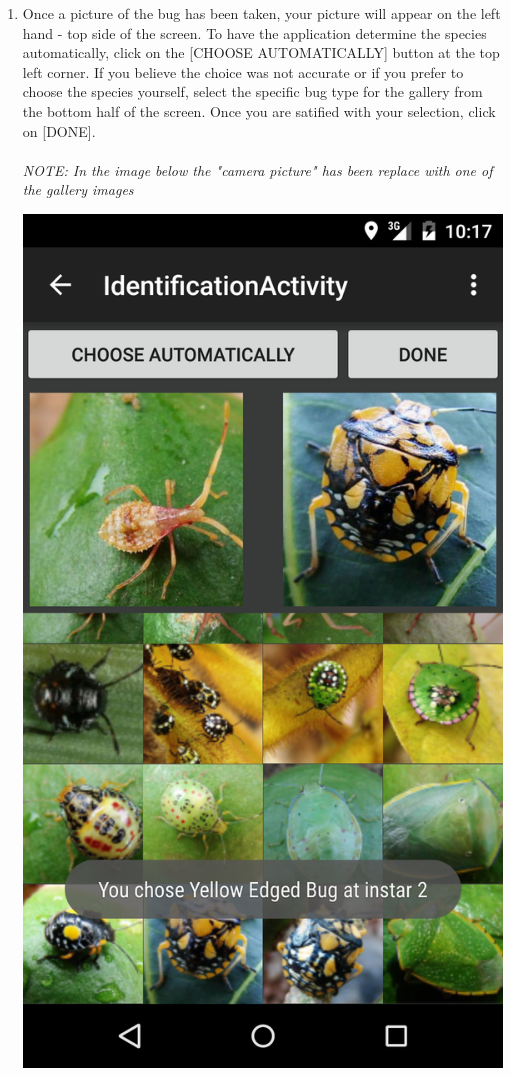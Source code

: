 \documentclass[11pt,a4paper,titlepage]{article}
\begin{document}
\begin{enumerate}
	\item Once a picture of the bug has been taken, your picture will appear on the left hand - top side of the screen. To have the application determine the species automatically, click on the [CHOOSE AUTOMATICALLY] button at the top left corner. If you believe the choice was not accurate or if you prefer to choose the species yourself, select the specific bug type for the gallery from the bottom half of the screen. Once you are satified with your selection, click on [DONE].\\
\hfill\\
\textit{NOTE: In the image below the "camera picture" has been replace with one of the gallery images}
	\begin{center}
				\includegraphics[scale=0.13]{shot4}
			\end{center}


\end{enumerate}
\end{document}
